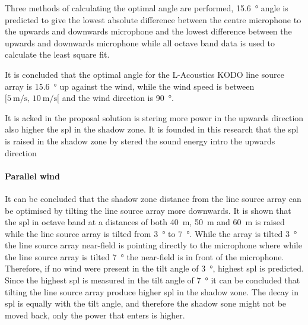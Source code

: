 Three methods of calculating the optimal angle are performed, \SI{15.6}{\degree} angle is predicted to give the lowest absolute difference between the centre microphone to the upwards and downwards microphone and the lowest difference between the upwards and downwards microphone while all octave band data is used to calculate the least square fit.

It is concluded that the optimal angle for the L-Acoustics KODO line source array is \SI{15.6}{\degree} up against the wind, while the wind speed is between $[\SI{5}{\meter\per\second},\, \SI{10}{\meter\per\second}[ $ and the wind direction is \SI{90}{\degree}.


It is acked in the proposal solution is stering more power in the upwards direction also higher the \gls{spl} in the shadow zone. It is founded in this research that the \gls{spl} is raised in the shadow zone by stered the sound energy intro the upwards direction 


\paragraph{Parallel wind}
It can be concluded that the shadow zone distance from the line source array can be optimised by tilting the line source array more downwards. It is shown that the \gls{spl} in octave band at a distances of both \SI{40}{\meter}, \SI{50}{\meter} and \SI{60}{\meter} is raised while the line source array is tilted from \SI{3}{\degree} to \SI{7}{\degree}. While the array is tilted \SI{3}{\degree} the line source array near-field is pointing directly to the microphone where while the line source array is tilted \SI{7}{\degree} the near-field is in front of the microphone. Therefore, if no wind were present in the tilt angle of \SI{3}{\degree}, highest \gls{spl} is predicted. Since the highest \gls{spl} is measured in the tilt angle of \SI{7}{\degree} it can be concluded that tilting the line source array produce higher \gls{spl} in the shadow zone. The decay in \gls{spl} is equally with the tilt angle, and therefore the shadow sone might not be moved back, only the power that enters is higher.  





